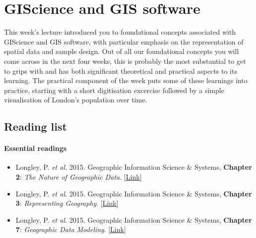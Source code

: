 \documentclass[
]{book}
\providecommand{\tightlist}{%
  \setlength{\itemsep}{0pt}\setlength{\parskip}{0pt}}
\begin{document}
\hypertarget{giscience-and-gis-software}{%
\chapter{GIScience and GIS software}\label{giscience-and-gis-software}}

This week's lecture introduced you to foundational concepts associated with GIScience and GIS software, with particular emphasis on the representation of spatial data and sample design. Out of all our foundational concepts you will come across in the next four weeks, this is probably the most substantial to get to grips with and has both significant theoretical and practical aspects to its learning. The practical component of the week puts some of these learnings into practice, starting with a short digitisation excercise followed by a simple visualisation of London's population over time.

\hypertarget{reading-w02}{%
\section{Reading list}\label{reading-w02}}

\hypertarget{essential-readings-1}{%
\subsubsection*{Essential readings}\label{essential-readings-1}}

\begin{itemize}
\tightlist
\item
  Longley, P. \emph{et al.} 2015. Geographic Information Science \& Systems, \textbf{Chapter 2}: \emph{The Nature of Geographic Data}. \href{https://ucl.rl.talis.com/link?url=https\%3A\%2F\%2Fapp.knovel.com\%2Fhotlink\%2Ftoc\%2Fid\%3AkpGISSE001\%2Fgeographic-information-science\%3Fkpromoter\%3Dmarc\&sig=e437927b963cc591dcb65491eccdd3869cc31aef80e1443cb2ba12d8f3bb031a}{{[}Link{]}}
\item
  Longley, P. \emph{et al.} 2015. Geographic Information Science \& Systems, \textbf{Chapter 3}: \emph{Representing Geography}. \href{https://ucl.rl.talis.com/link?url=https\%3A\%2F\%2Fapp.knovel.com\%2Fhotlink\%2Ftoc\%2Fid\%3AkpGISSE001\%2Fgeographic-information-science\%3Fkpromoter\%3Dmarc\&sig=e437927b963cc591dcb65491eccdd3869cc31aef80e1443cb2ba12d8f3bb031a}{{[}Link{]}}
\item
  Longley, P. \emph{et al.} 2015. Geographic Information Science \& Systems, \textbf{Chapter 7}: \emph{Geographic Data Modeling}. \href{https://ucl.rl.talis.com/link?url=https\%3A\%2F\%2Fapp.knovel.com\%2Fhotlink\%2Ftoc\%2Fid\%3AkpGISSE001\%2Fgeographic-information-science\%3Fkpromoter\%3Dmarc\&sig=e437927b963cc591dcb65491eccdd3869cc31aef80e1443cb2ba12d8f3bb031a}{{[}Link{]}}
\end{itemize}
\end{document}
